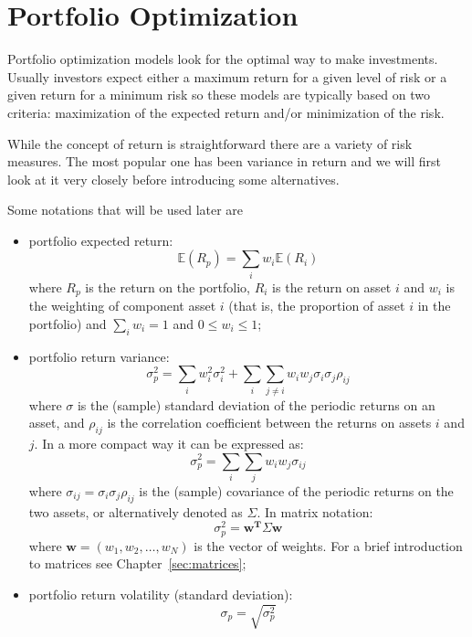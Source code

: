 \chapter{Portfolio Optimization}\label{portfolio-optimization}

Portfolio optimization models look for the optimal way to make investments. Usually investors expect either a maximum return for a given level of risk or a given return for a minimum risk so these models are typically based on two criteria: maximization of the expected return and/or minimization of the risk.

While the concept of return is straightforward there are a variety of risk measures. The most popular one has been variance in return and we will first look at it very closely before introducing some alternatives.

Some notations that will be used later are

\begin{itemize}
\tightlist
\item
  portfolio expected return: 
  \begin{equation} 
  	\mathbb{E}(R_{p}) = \sum _{i}w_{i} \mathbb{E}(R_{i}) 
  \end{equation} 
  where \(R_{p}\) is the return on the portfolio, \(R_{i}\) is the return on
  asset \(i\) and \(w_{i}\) is the weighting of component asset \(i\)
  (that is, the proportion of asset \(i\) in the portfolio) and
  \(\sum_{i}w_i = 1\) and \(0 \le w_i \le 1\);
\item
  portfolio return variance:
  \begin{equation} 
 	\sigma _{p}^{2} = \sum _{i}w_{i}^{2}\sigma _{i}^{2} + \sum _{i}\sum _{j\neq i}w_{i}w_{j}\sigma _{i}\sigma _{j}\rho _{ij} \end{equation}
  where \(\sigma\) is the (sample) standard deviation of the periodic
  returns on an asset, and \(\rho _{ij}\) is the correlation coefficient
  between the returns on assets \(i\) and \(j\). In a more compact way
  it can be expressed as:
  \begin{equation} 
  	\sigma _{p}^{2}=\sum _{i}\sum _{j}w_{i}w_{j}\sigma _{ij} 
  \end{equation} 
  where \(\sigma _{ij}=\sigma _{i}\sigma _{j}\rho _{ij}\) is the (sample)
  covariance of the periodic returns on the two assets, or alternatively
  denoted as \(\Sigma\).
  In matrix notation:
  \begin{equation}
  	\sigma_p^2 = \mathbf{w^T}\Sigma\mathbf{w} 
  \end{equation}
  where $\mathbf{w} = (w_1,w_2,\ldots,w_N)$ is the vector of weights. 
  For a brief introduction to matrices see Chapter~\ref{sec:matrices};
\item
  portfolio return volatility (standard deviation):
  \begin{equation}
  	\sigma _{p}= \sqrt{\sigma _{p}^{2}}
  \end{equation}
\end{itemize}

